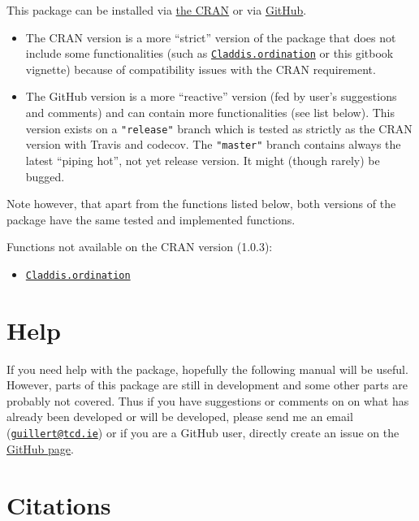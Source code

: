 \documentclass[]{book}
\providecommand{\tightlist}{%
  \setlength{\itemsep}{0pt}\setlength{\parskip}{0pt}}
\theoremstyle{definition}
\theoremstyle{definition}
\theoremstyle{remark}
\begin{document}
This package can be installed via \href{}{the CRAN} or via
\href{https://github.com/TGuillerme/dispRity}{GitHub}.

\begin{itemize}
\item
  The CRAN version is a more ``strict'' version of the package that does
  not include some functionalities (such as
  \protect\hyperlink{Claddis-ordination}{\texttt{Claddis.ordination}} or
  this gitbook vignette) because of compatibility issues with the CRAN
  requirement.
\item
  The GitHub version is a more ``reactive'' version (fed by user's
  suggestions and comments) and can contain more functionalities (see
  list below). This version exists on a \texttt{"release"} branch which
  is tested as strictly as the CRAN version with Travis and codecov. The
  \texttt{"master"} branch contains always the latest ``piping hot'',
  not yet release version. It might (though rarely) be bugged.
\end{itemize}

Note however, that apart from the functions listed below, both versions
of the package have the same tested and implemented functions.

Functions not available on the CRAN version (1.0.3):

\begin{itemize}
\tightlist
\item
  \protect\hyperlink{Claddis-ordination}{\texttt{Claddis.ordination}}
\end{itemize}

\section{Help}\label{help}

If you need help with the package, hopefully the following manual will
be useful. However, parts of this package are still in development and
some other parts are probably not covered. Thus if you have suggestions
or comments on on what has already been developed or will be developed,
please send me an email
(\href{mailto:guillert@tcd.ie}{\nolinkurl{guillert@tcd.ie}}) or if you
are a GitHub user, directly create an issue on the
\href{https://github.com/TGuillerme/dispRity}{GitHub page}.

\section{Citations}\label{citations}
\end{document}
